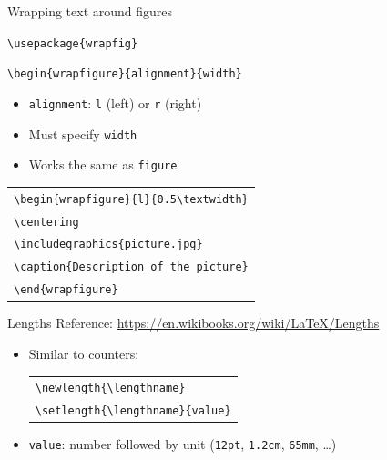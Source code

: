 \documentclass[11pt]{beamer}
\newcommand{\bs}{\textbackslash}
\begin{document}
\begin{frame}{Wrapping text around figures}

 \texttt{\bs usepackage\{{\color{red}wrapfig}\}}

  \texttt{\bs begin\{wrapfigure\}{\color{red}\{alignment\}\{width\}}}
  
  \vspace{1cm}
  \begin{itemize}
    \item \texttt{alignment}: \texttt{l} (left) or \texttt{r} (right)
    \item Must specify \texttt{width}
    \item Works the same as \texttt{figure}
  \end{itemize}

  \vspace{0.3cm}
  \begin{center} \begin{tabular}{l}
    \texttt{\bs begin\{wrapfigure\}{\color{red}\{l\}\{0.5\bs textwidth\}}} \\
    \texttt{\qquad\bs centering} \\
    \texttt{\qquad \bs includegraphics\{picture.jpg\}} \\
    \texttt{\qquad \bs caption\{Description of the picture\}} \\
    \texttt{\bs end\{wrapfigure\}}
  \end{tabular} \end{center}
\end{frame}


\begin{frame}{Lengths}
  Reference: \url{https://en.wikibooks.org/wiki/LaTeX/Lengths}

  \vspace{0.5cm}
  \begin{itemize}
    \item Similar to counters:

          \vspace{0.3cm}
          \begin{center}\begin{tabular}{l}
            \texttt{\bs newlength\{\bs lengthname\}}\\
            \texttt{\bs setlength\{\bs lengthname\}\{value\}}
          \end{tabular}\end{center}
          
    \vspace{0.3cm}
    \item \texttt{value}: number followed by unit
          (\texttt{12pt}, \texttt{1.2cm}, \texttt{65mm}, \dots)
  \end{itemize}
\end{frame}
\end{document}
